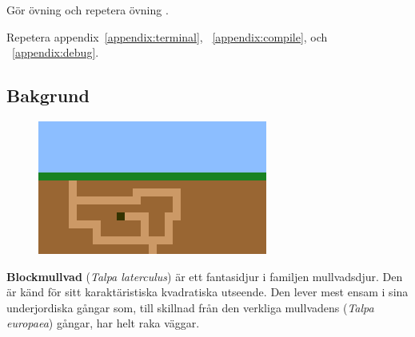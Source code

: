 
\Lab{\LabWeekFOUR}
\begin{Goals}

\end{Goals}

\begin{Preparations}
\item Gör övning \texttt{\ExeWeekFOUR} och repetera övning \texttt{\ExeWeekTHREE}.
\item Repetera appendix~\ref{appendix:terminal}, ~\ref{appendix:compile}, och ~\ref{appendix:debug}.
\end{Preparations}



\subsection{Bakgrund}


\begin{minipage}{0.48\textwidth}
\begin{figure}[H]
  \centering
  \includegraphics[width=\textwidth]{../img/blockmole-sky-grass.png}
  \label{lab:blockmole:fig:mole}
\end{figure}
\end{minipage}%
%
\hfill\begin{minipage}{0.45\textwidth}
\noindent\textbf{Blockmullvad} (\textit{Talpa laterculus}) är ett fantasidjur i familjen mullvadsdjur.
Den är känd för sitt karaktäristiska kvadratiska utseende.
Den lever mest ensam i sina underjordiska gångar som, till skillnad från den verkliga mullvadens (\emph{Talpa europaea}) gångar, har helt raka väggar.
\end{minipage}



